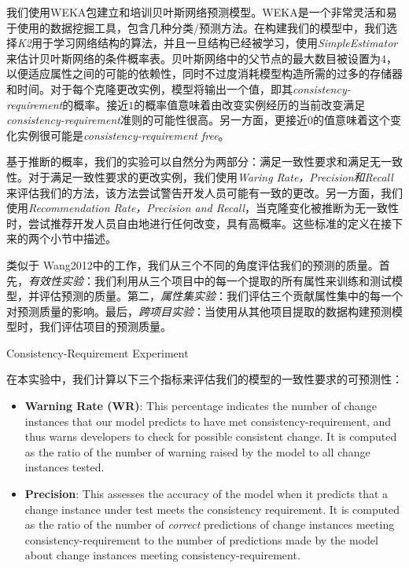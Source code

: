 {我们使用WEKA包建立和培训贝叶斯网络预测模型。WEKA是一个非常灵活和易于使用的数据挖掘工具，包含几种分类/预测方法。在构建我们的模型中，我们选择{\em K2}用于学习网络结构的算法，并且一旦结构已经被学习，使用{\em  SimpleEstimator}来估计贝叶斯网络的条件概率表。贝叶斯网络中的父节点的最大数目被设置为$ 4 $，以便适应属性之间的可能的依赖性，同时不过度消耗模型构造所需的过多的存储器和时间。对于每个克隆更改实例，模型将输出一个值，即其{\em consistency-requirement}的概率。接近$ 1 $的概率值意味着由改变实例经历的当前改变满足{\em consistency-requirement}准则的可能性很高。另一方面，更接近$ 0 $的值意味着这个变化实例很可能是{\em consistency-requirement free}。

基于推断的概率，我们的实验可以自然分为两部分：满足一致性要求和满足无一致性。对于满足一致性要求的更改实例，我们使用{\em Waring Rate，Precision和Recall}来评估我们的方法，该方法尝试警告开发人员可能有一致的更改。另一方面，我们使用{\em Recommendation Rate，Precision and Recall}，当克隆变化被推断为无一致性时，尝试推荐开发人员自由地进行任何改变，具有高概率。这些标准的定义在接下来的两个小节中描述。

类似于\cite{} {Wang2012}中的工作，我们从三个不同的角度评估我们的预测的质量。首先，{\em 有效性实验}：我们利用从三个项目中的每一个提取的所有属性来训练和测试模型，并评估预测的质量。第二，{\em 属性集实验}：我们评估三个贡献属性集中的每一个对预测质量的影响。最后，{\em 跨项目实验}：当使用从其他项目提取的数据构建预测模型时，我们评估项目的预测质量。


{Consistency-Requirement Experiment}

在本实验中，我们计算以下三个指标来评估我们的模型的一致性要求的可预测性：
\begin{itemize}
\item \textbf{Warning Rate (WR)}: 
This percentage indicates the number of change instances that our model predicts to have met consistency-requirement, and thus warns developers to check for possible consistent change.
It is computed as the ratio of the number of warning raised by the model to all change instances tested. 

\item \textbf{Precision}: 
This assesses the accuracy of the model when it predicts that a change instance under test meets the consistency requirement. 
It is computed as the ratio of the number of {\em correct} predictions of change instances meeting consistency-requirement to the number of predictions made by the model about change instances meeting consistency-requirement.


\end{itemize}}
